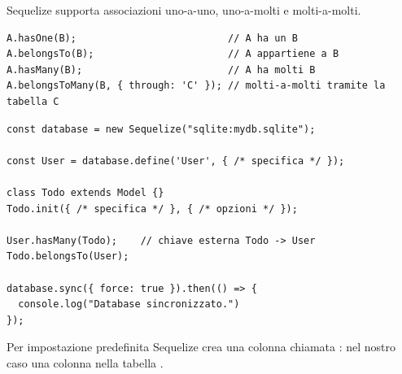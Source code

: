 Sequelize supporta associazioni uno-a-uno, uno-a-molti e molti-a-molti.

\begin{lstlisting}[style=js]
A.hasOne(B);                          // A ha un B
A.belongsTo(B);                       // A appartiene a B
A.hasMany(B);                         // A ha molti B
A.belongsToMany(B, { through: 'C' }); // molti-a-molti tramite la tabella C
\end{lstlisting}

\begin{affianco}[0.55][c]
\codicepiccolo
\begin{lstlisting}[style=js, name=models/Database.js]
const database = new Sequelize("sqlite:mydb.sqlite");

const User = database.define('User', { /* specifica */ });

class Todo extends Model {}
Todo.init({ /* specifica */ }, { /* opzioni */ });

User.hasMany(Todo);    // chiave esterna Todo -> User
Todo.belongsTo(User);

database.sync({ force: true }).then(() => {
  console.log("Database sincronizzato.")
});
\end{lstlisting}
\risultato
\begin{immagine}
\end{immagine}
\end{affianco}

Per impostazione predefinita Sequelize crea una colonna chiamata
: nel nostro caso una colonna
 nella tabella .

